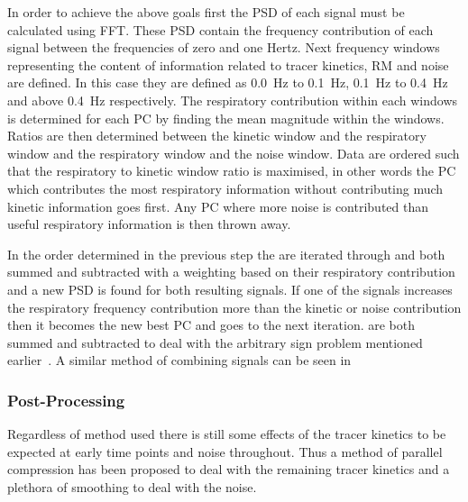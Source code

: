                     In order to achieve the above goals first the \gls{PSD} of each signal must be calculated using \gls{FFT}. These \gls{PSD} contain the frequency contribution of each signal between the frequencies of zero and one Hertz. Next frequency windows representing the content of information related to tracer kinetics, \gls{RM} and noise are defined. In this case they are defined as \SI{0.0}{\hertz} to \SI{0.1}{\hertz}, \SI{0.1}{\hertz} to \SI{0.4}{\hertz} and above \SI{0.4}{\hertz} respectively. The respiratory contribution within each windows is determined for each \gls{PC} by finding the mean magnitude within the windows. Ratios are then determined between the kinetic window and the respiratory window and the respiratory window and the noise window. Data are ordered such that the respiratory to kinetic window ratio is maximised, in other words the \gls{PC} which contributes the most respiratory information without contributing much kinetic information goes first. Any \gls{PC} where more noise is contributed than useful respiratory information is then thrown away.
                    
                    In the order determined in the previous step the  are iterated through and both summed and subtracted with a weighting based on their respiratory contribution and a new \gls{PSD} is found for both resulting signals. If one of the signals increases the respiratory frequency contribution more than the kinetic or noise contribution then it becomes the new best \gls{PC} and goes to the next iteration.  are both summed and subtracted to deal with the arbitrary sign problem mentioned earlier~. A similar method of combining signals can be seen in~
                
                \subsubsection{Post-Processing} \label{sec:pca_data_driven_surrogate_signal_extraction_methods_for_dynamic_pet_methods_post_processing}
                    Regardless of method used there is still some effects of the tracer kinetics to be expected at early time points and noise throughout. Thus a method of parallel compression has been proposed to deal with the remaining tracer kinetics and a plethora of smoothing to deal with the noise.
                    

